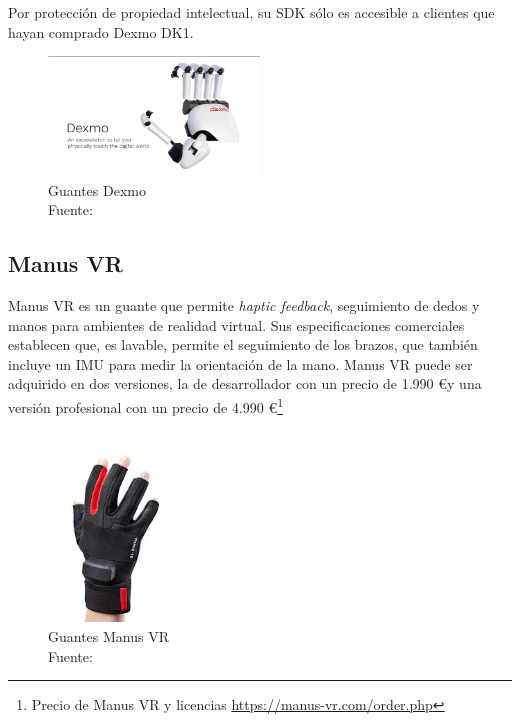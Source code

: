 Por protección de propiedad intelectual, su SDK sólo es accesible a clientes que hayan comprado Dexmo DK1. %
    
            
\begin{figure}[H]
  \begin{center} 
   	\includegraphics[width=0.5\textwidth]{images/fig-analisis-solucion/dexmo.png} 
    \caption[Guantes Dexmo]{Guantes Dexmo \\Fuente: \cite{dexmo-info-page}}  
    \label{fig:dexmo}
  \end{center}
\end{figure}
    
\subsection{Manus VR}
	Manus VR es un guante que permite \textit{haptic feedback}, seguimiento de dedos y manos para ambientes de realidad virtual. Sus especificaciones comerciales establecen que, es lavable, permite el seguimiento de los brazos, que también incluye un IMU para medir la orientación de la mano. Manus VR puede ser adquirido en dos versiones, la de desarrollador con un precio de 1.990 \euro \space y una versión profesional con un precio de 4.990 \euro \space \footnote{Precio de Manus VR y licencias \url{https://manus-vr.com/order.php}}
    
\begin{figure}[H]
  \begin{center} 
   	\includegraphics[width=0.3\textwidth]{images/fig-analisis-solucion/manus-vr.jpeg} 
    \caption[Guantes Manus VR]{Guantes Manus VR \\Fuente: \cite{manusvr-info-page}} 
    \label{fig:manus-vr}
  \end{center}
\end{figure}

